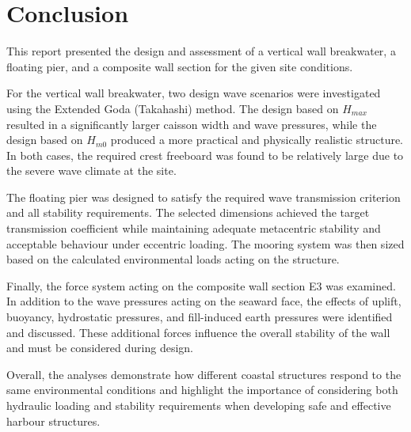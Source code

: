 \documentclass[a4paper, 11pt]{article}
\begin{document}
\newpage
\section{Conclusion}
\hspace{0.5cm}This report presented the design and assessment of a vertical wall breakwater, a floating pier, and a composite wall section for the given site conditions.

For the vertical wall breakwater, two design wave scenarios were investigated using the Extended Goda (Takahashi) method. The design based on $H_{max}$ resulted in a significantly larger caisson width and wave pressures, while the design based on $H_{m0}$ produced a more practical and physically realistic structure. In both cases, the required crest freeboard was found to be relatively large due to the severe wave climate at the site.

The floating pier was designed to satisfy the required wave transmission criterion and all stability requirements. The selected dimensions achieved the target transmission coefficient while maintaining adequate metacentric stability and acceptable behaviour under eccentric loading. The mooring system was then sized based on the calculated environmental loads acting on the structure.

Finally, the force system acting on the composite wall section E3 was examined. In addition to the wave pressures acting on the seaward face, the effects of uplift, buoyancy, hydrostatic pressures, and fill-induced earth pressures were identified and discussed. These additional forces influence the overall stability of the wall and must be considered during design.

Overall, the analyses demonstrate how different coastal structures respond to the same environmental conditions and highlight the importance of considering both hydraulic loading and stability requirements when developing safe and effective harbour structures.

\newpage

\end{document}
